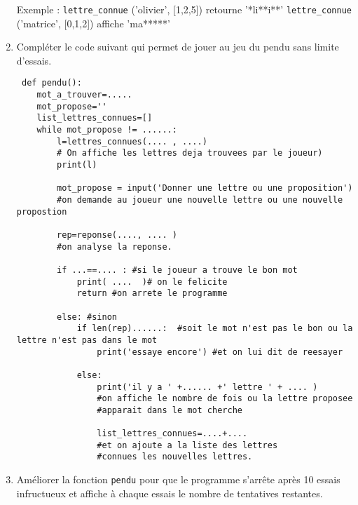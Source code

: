 \documentclass[a4paper, 11pt,reqno]{article}
\begin{document}
\begin{exercice}
\begin{enumerate}
Exemple : \texttt{lettre\_connue} ('olivier', [1,2,5]) retourne '*li**i**' 
\texttt{lettre\_connue} ('matrice', [0,1,2]) affiche 'ma*****'
 

 \item Compléter le code suivant qui permet de jouer au jeu du pendu  sans limite d'essais. 
\newpage
 \begin{lstlisting}
 def pendu():
    mot_a_trouver=.....
    mot_propose=''
    list_lettres_connues=[]
    while mot_propose != ......:    
        l=lettres_connues(.... , ....)
        # On affiche les lettres deja trouvees par le joueur)
        print(l)

        mot_propose = input('Donner une lettre ou une proposition') 
        #on demande au joueur une nouvelle lettre ou une nouvelle propostion

        rep=reponse(...., .... ) 
        #on analyse la reponse.

        if ...==.... : #si le joueur a trouve le bon mot
            print( ....  )# on le felicite
            return #on arrete le programme

        else: #sinon
            if len(rep)......:  #soit le mot n'est pas le bon ou la lettre n'est pas dans le mot
                print('essaye encore') #et on lui dit de reesayer

            else:
                print('il y a ' +...... +' lettre ' + .... )  
                #on affiche le nombre de fois ou la lettre proposee 
                #apparait dans le mot cherche
                
                list_lettres_connues=....+.... 
                #et on ajoute a la liste des lettres 
                #connues les nouvelles lettres.

 \end{lstlisting}
 
 \item Améliorer la fonction \texttt{pendu} pour que le programme s'arrête après 10 essais infructueux et affiche à chaque essais le nombre de tentatives restantes. 


\end{enumerate}
\end{exercice}
\end{document}
